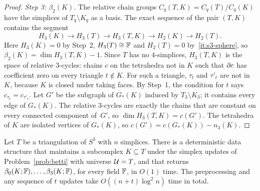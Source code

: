\begin{proof}
\emph{Step 3: $\beta_2(K)$.}
The relative chain groups $C_q(T,K)=C_q(T)/C_q(K)$ have the simplices of $T_q\setminus K_q$ as a basis.
The exact sequence of the pair $(T,K)$~\cite{Mun84} contains the segment
\[
  H_3(K)\to H_3(T)\to H_3(T,K)\to H_2(K)\to H_2(T).
\]
Here $H_3(K)=0$ by Step~2, $H_3(T)\cong\mathbb{F}$ and $H_2(T)=0$ by~\ref{it:s3-sphere}, so $\beta_2(K)=\dim H_3(T,K)-1$.
Since $T$ has no $4$-simplices, $H_3(T,K)$ is the space of relative $3$-cycles: chains $c$ on the tetrahedra not in $K$ such that $\partial c$ has coefficient zero on every triangle $t\notin K$.
For such a triangle, $\tau_t$ and $\tau'_t$ are not in $K$, because $K$ is closed under taking faces.
By Step~1, the condition for $t$ says $c_{\tau_t}=c_{\tau'_t}$.
Let $G'$ be the subgraph of $G_\ast(K)$ induced by $T_3\setminus K_3$; it contains every edge of $G_\ast(K)$.
The relative $3$-cycles are exactly the chains that are constant on every connected component of~$G'$, so $\dim H_3(T,K)=c(G')$.
The tetrahedra of $K$ are isolated vertices of $G_\ast(K)$, so $c(G')=c(G_\ast(K))-n_3(K)$.
\end{proof}

\begin{theorem}\label{thm:s3}
Let $T$ be a triangulation of $S^3$ with $n$ simplices.
There is a deterministic data structure that maintains a subcomplex $K\subseteq T$ under the simplex updates of Problem~\ref{prob:betti} with universe $\mathcal{U}=T$, and that returns $\beta_0(K;\mathbb{F}),\dots,\beta_3(K;\mathbb{F})$, for every field $\mathbb{F}$, in $O(1)$ time.
The preprocessing and any sequence of $t$ updates take $O((n+t)\log^2n)$ time in total.
\end{theorem}

